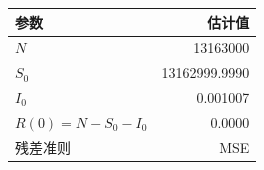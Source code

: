 \begin{tabular}{lr}
\toprule
参数 & 估计值 \\
\midrule
$N$ & 13163000 \\
$S_0$ & 13162999.9990 \\
$I_0$ & 0.001007 \\
$R(0)=N-S_0-I_0$ & 0.0000 \\
残差准则 & MSE \\
\bottomrule
\end{tabular}

